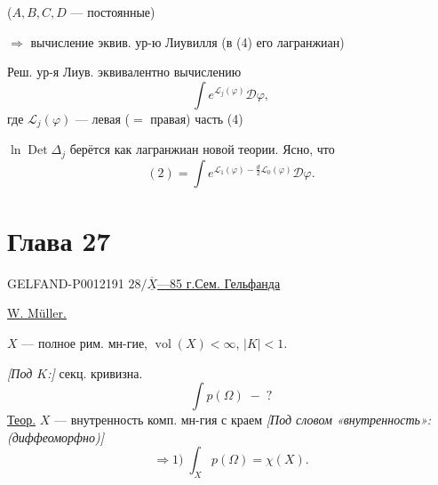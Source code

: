 (\(A,B,C,D\) --- постоянные)

\(\Rightarrow\) вычисление эквив. ур-ю Лиувилля (в (4) его лагранжиан)

Реш. ур-я Лиув. эквивалентно вычислению
\begin{equation*}
\int e^{\mathcal L_j(\varphi)}\mathcal D\varphi,\tag{5}
\end{equation*}
где \(\mathcal L_j(\varphi)\) --- левая (\(=\) правая) часть (4)

\(\ln\operatorname{Det}\Delta_j\) берётся как лагранжиан новой теории. Ясно, что
\begin{equation*}
(2)=\int e^{\mathcal L_1(\varphi)-\frac d2\mathcal L_0(\varphi)}\mathcal D\varphi.\tag{6}
\end{equation*}


\clearpage
{}
\section*{Глава 27}
\begin{GelfandAdjacentEvidence}{GELFAND-P001219}{1}
\underline{\(28/\overline{\underline{X}}\)---85 г.}\qquad \underline{Сем. Гельфанда}

\underline{W. Müller.}


\(X\) --- полное рим. мн-гие, \(\operatorname{vol}(X)<\infty\), \(\lvert K\rvert<1\).

\textit{[Под \(K\):]} секц. кривизна.
\[
\int p(\Omega)\;-\;?
\]
\underline{Теор.} \(X\) --- внутренность комп. мн-гия с краем
\textit{[Под словом «внутренность»: (диффеоморфно)]}
\[
\Rightarrow 1)\;\int_X p(\Omega)=\chi(X).
\]
\end{GelfandAdjacentEvidence}



